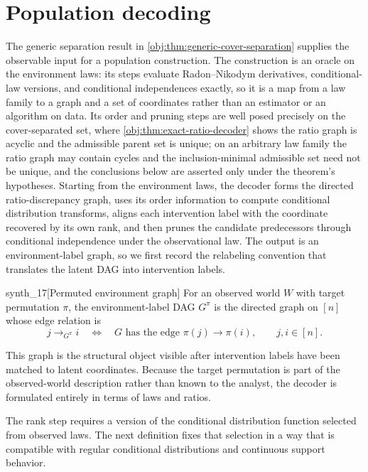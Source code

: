 \documentclass[11pt]{article}
\begin{document}
\section{Population decoding}\label{sec:population-decoding}

The generic separation result in \cref{obj:thm:generic-cover-separation} supplies the observable input for a population construction. The construction is an oracle on the environment laws: its steps evaluate Radon--Nikodym derivatives, conditional-law versions, and conditional independences exactly, so it is a map from a law family to a graph and a set of coordinates rather than an estimator or an algorithm on data. Its order and pruning steps are well posed precisely on the cover-separated set, where \cref{obj:thm:exact-ratio-decoder} shows the ratio graph is acyclic and the admissible parent set is unique; on an arbitrary law family the ratio graph may contain cycles and the inclusion-minimal admissible set need not be unique, and the conclusions below are asserted only under the theorem's hypotheses. Starting from the environment laws, the decoder forms the directed ratio-discrepancy graph, uses its order information to compute conditional distribution transforms, aligns each intervention label with the coordinate recovered by its own rank, and then prunes the candidate predecessors through conditional independence under the observational law. The output is an environment-label graph, so we first record the relabeling convention that translates the latent DAG into intervention labels.

\begin{definitionv}{synth_17}[Permuted environment graph]
For an observed world \(W\) with target permutation \(\pi\), the environment-label DAG \(G^\pi\) is the directed graph on \([n]\) whose edge relation is
\[
j\to_{G^\pi} i
\quad\Longleftrightarrow\quad
G\text{ has the edge }\pi(j)\to \pi(i),
\qquad j,i\in[n].
\]
\end{definitionv}

This graph is the structural object visible after intervention labels have been matched to latent coordinates. Because the target permutation is part of the observed-world description rather than known to the analyst, the decoder is formulated entirely in terms of laws and ratios.

The rank step requires a version of the conditional distribution function selected from observed laws. The next definition fixes that selection in a way that is compatible with regular conditional distributions and continuous support behavior.
\end{document}
